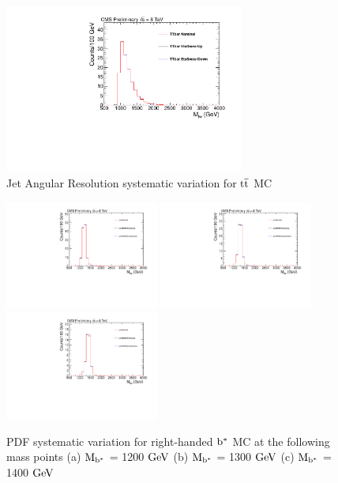 \begin{figure}[htcb]
\begin{center}
\includegraphics[width=0.7\textwidth]{AN-14-049/figs/TTbar_EtaScaling}
\caption{Jet Angular Resolution systematic variation for $\mathrm{t\overline{t}}$ MC}
\label{figs:bsttbarJAR}
\end{center}
\end{figure}

\begin{figure}[htcb]
\begin{center}
\includegraphics[width=0.45\textwidth]{AN-14-049/figs/Signal_M1200_PdfScaleNNPDF23.pdf}
\includegraphics[width=0.45\textwidth]{AN-14-049/figs/Signal_M1300_PdfScaleNNPDF23.pdf}
\includegraphics[width=0.45\textwidth]{AN-14-049/figs/Signal_M1400_PdfScaleNNPDF23.pdf}
\caption{
PDF systematic variation for right-handed $\mathrm{b}^{*}$  MC at the following mass points
(a) $\mathrm{M_{\mathrm{b}^{*}}}$ = 1200$~\mathrm{GeV}$ 
(b) $\mathrm{M_{\mathrm{b}^{*}}}$ = 1300$~\mathrm{GeV}$
(c) $\mathrm{M_{\mathrm{b}^{*}}}$ = 1400$~\mathrm{GeV}$ 
}
\label{figs:bssignalPDF}
\end{center}
\end{figure}

